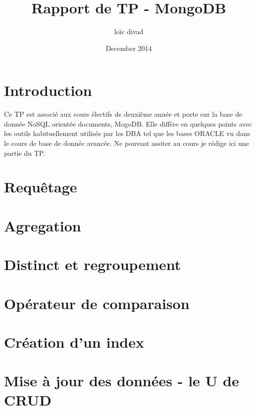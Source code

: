 \documentclass{article}
\title{Rapport de TP - MongoDB}
\author{loïc divad}
\date{December 2014}
\begin{document}
\maketitle

\section{Introduction}
Ce TP est associé aux cours électifs de deuxième année et porte sur la base de donnée NoSQL orientée documents, MogoDB. Elle diffère en quelques points avec les outils habituellement utilisés par les DBA tel que les bases ORACLE vu dans le cours de base de donnée avancée. Ne pouvant assiter au cours je rédige ici une partie du TP.


\section{Requêtage}
    
    
    
    
\section{Agregation}

    
    
\section{Distinct et regroupement}
    
    
    
\section{Opérateur de comparaison}

    
    
\newpage

\section{Création d'un index}
    
    
    
\newpage

    
    
\section{Mise à jour des données - le U de CRUD}
\end{document}
